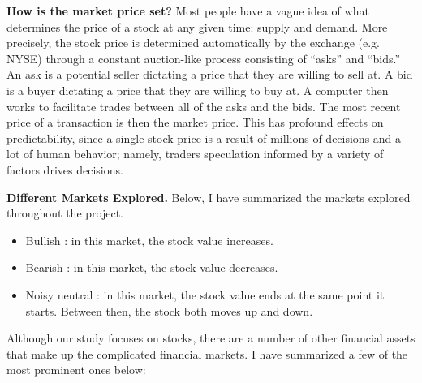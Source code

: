 \documentclass[12pt]{article}
\begin{document}
\textbf{How is the market price set?} Most people have a vague idea of what determines the price of a stock at any given time: supply and demand. More precisely, the stock price is determined automatically by the exchange (e.g. NYSE) through a constant auction-like process consisting of ``asks'' and ``bids.'' An ask is a potential seller dictating a price that they are willing to sell at. A bid is a buyer dictating a price that they are willing to buy at. A computer then works to facilitate trades between all of the asks and the bids. The most recent price of a transaction is then the market price. This has profound effects on predictability, since a single stock price is a result of millions of decisions and a lot of human behavior; namely, traders speculation informed by a variety of factors drives decisions. \cite{stock}

\textbf{Different Markets Explored.} Below, I have summarized the markets explored throughout the project.

\begin{itemize}
	\item Bullish : in this market, the stock value increases. 
	
	\item Bearish : in this market, the stock value decreases.
	
	\item Noisy neutral : in this market, the stock value ends at the same point it starts. Between then, the stock both moves up and down. 
\end{itemize}

Although our study focuses on stocks, there are a number of other financial assets that make up the complicated financial markets. I have summarized a few of the most prominent ones below:
\end{document}
